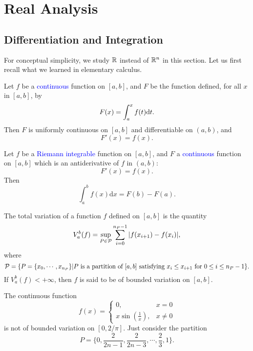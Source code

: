 \chapter{Real Analysis}


\section{}


\section{Differentiation and Integration}
For conceptual simplicity, we study $\mathbb{R}$ instead of $\mathbb{R}^n$ in this section.
Let us first recall what we learned in elementary calculus.

\begin{theorem}
    Let \( f \) be a \textcolor{blue}{continuous} function on \([a,b]\),
    and $F$ be the function defined, for all $x$ in $[a,b]$, by
    $$F(x)=\int_a^x f(t)\mathrm{d} t.$$
    Then $F$ is uniformly continuous on $[a,b]$ and differentiable on $(a,b)$, and $$F'(x)=f(x).$$  
\end{theorem}

\begin{theorem}\label{thm:newton-leibniz}
    Let \( f \) be a \textcolor{blue}{Riemann integrable} function on \([a,b]\),
    and $F$ a \textcolor{blue}{continuous} function on $[a,b]$ which is an antiderivative of $f$ in $(a,b)$:
    $$F'(x)=f(x).$$
    Then $$\int_a^b f(x)\mathrm{d}x=F(b)-F(a).$$  
\end{theorem}


\begin{definition}
    The total variation of a function $f$ defined on $[a,b]$ is the quantity
    $$ V_a^b(f)=\sup_{P\in\mathcal{P}}\sum_{i=0}^{n_P-1}|f(x_{i+1})-f(x_i)|,$$
    where
    $$\mathcal{P}=\{P=\{x_0,\cdots,x_{n_P}\}| P \text{ is a partition of }[a,b]\text{ satisfying }x_i\leq x_{i+1}\text{ for }0\leq i\leq n_P-1\}.$$
    If $V_a^b(f)<+\infty$, then $f$ is said to be of bounded variation on $[a,b]$.
\end{definition}

\begin{example}
    The continuous function 
    $$f(x)=\left\{\begin{matrix}
        0,  &  x=0\\
        x\sin(\frac{1}{x}),  & x\neq 0
        \end{matrix}\right.$$
    is not of bounded variation on $[0,2/\pi]$. Just consider the partition $$P=\{0,\frac{2}{2n-1},\frac{2}{2n-3},\cdots,\frac{2}{3},1\}.$$
\end{example}

